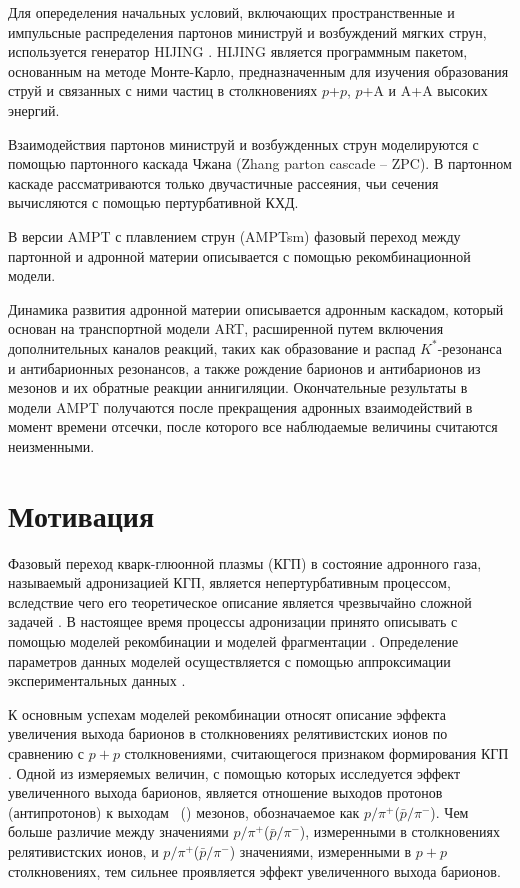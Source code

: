 Для опеределения начальных условий, включающих пространственные и импульсные распределения партонов министруй и возбуждений мягких струн, используется генератор HIJING \cite{HIJING}. HIJING является программным пакетом, основанным на методе Монте-Карло, предназначенным для изучения образования струй и связанных с ними частиц в столкновениях $p$+$p$, $p$+A и A+A высоких энергий.
 
Взаимодействия партонов министруй и возбужденных струн моделируются с помощью партонного каскада Чжана (Zhang parton cascade -- ZPC). В партонном каскаде рассматриваются только двучастичные рассеяния, чьи сечения вычисляются с помощью пертурбативной КХД. 

В версии AMPT с плавлением струн (AMPTsm) фазовый переход между партонной и адронной материи описывается с помощью рекомбинационной модели. 

Динамика развития адронной материи описывается адронным каскадом, который основан на транспортной модели ART, расширенной путем включения дополнительных каналов реакций, таких как образование и распад $K^*$-резонанса и антибарионных резонансов, а также рождение барионов и антибарионов из мезонов и их обратные реакции аннигиляции. 
Окончательные результаты в модели AMPT получаются после прекращения адронных взаимодействий в момент времени отсечки, после которого все наблюдаемые величины считаются неизменными.  


\section{Мотивация}
Фазовый переход кварк-глюонной плазмы (КГП) \cite{QGP} в состояние адронного газа, называемый адронизацией КГП, является непертурбативным процессом, вследствие чего его теоретическое описание является чрезвычайно сложной задачей \cite{Coalescence_models}. В настоящее время процессы адронизации принято описывать с помощью моделей рекомбинации \cite{Coalescence_models, Recombination1, Recombination2} и моделей фрагментации \cite{FragmentationLund}. Определение параметров данных моделей осуществляется с помощью аппроксимации экспериментальных данных \cite{Coalescence_models, AMPT}. 

К основным успехам моделей рекомбинации относят описание эффекта увеличения выхода барионов в столкновениях релятивистских ионов по сравнению с $p+p$ столкновениями, считающегося признаком формирования КГП \cite{p2piRatio_130GeV, p2piRatio_2003}. Одной из измеряемых величин, с помощью которых исследуется эффект увеличенного выхода барионов, является отношение выходов протонов (антипротонов) к выходам  \pip \ (\pim) мезонов, обозначаемое как  $p/\pi^{+}$($\bar{p}/\pi^{-}$). Чем больше различие между значениями $p/\pi^{+}$($\bar{p}/\pi^{-}$), измеренными в столкновениях релятивистских ионов, и  $p/\pi^{+}$($\bar{p}/\pi^{-}$) значениями, измеренными в $p+p$ столкновениях, тем сильнее проявляется эффект увеличенного выхода барионов. 

